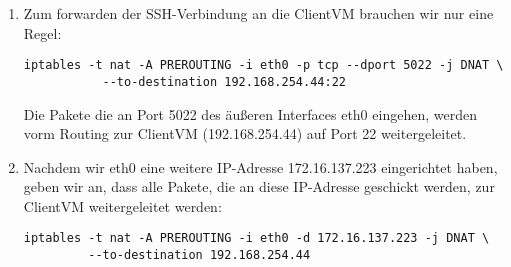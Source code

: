 \documentclass[a4paper,10pt]{scrartcl}
\begin{document}
\begin{enumerate}[\bfseries 1.]
	\item
        Zum forwarden der SSH-Verbindung an die ClientVM brauchen wir nur eine Regel:
        \begin{lstlisting}
iptables -t nat -A PREROUTING -i eth0 -p tcp --dport 5022 -j DNAT \
           --to-destination 192.168.254.44:22
		\end{lstlisting}
		Die Pakete die an Port 5022 des äußeren Interfaces eth0 eingehen, werden vorm
		Routing zur ClientVM (192.168.254.44) auf Port 22 weitergeleitet.

	\item
        Nachdem wir eth0 eine weitere IP-Adresse 172.16.137.223 eingerichtet haben,
		geben wir an, dass alle Pakete, die an diese IP-Adresse geschickt werden,
		zur ClientVM weitergeleitet werden:
		\begin{lstlisting}
iptables -t nat -A PREROUTING -i eth0 -d 172.16.137.223 -j DNAT \
         --to-destination 192.168.254.44
		\end{lstlisting}
\end{enumerate}
\end{document}
